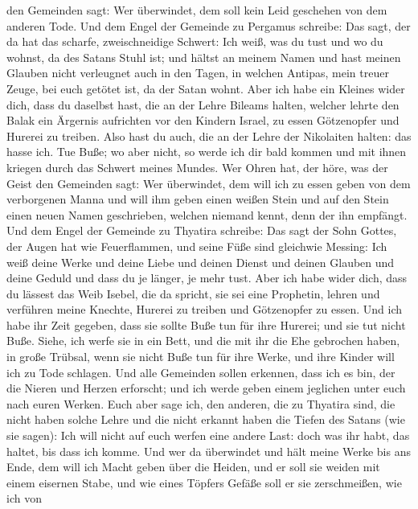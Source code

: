 den Gemeinden sagt: Wer überwindet, dem soll kein Leid geschehen von dem
anderen Tode.  Und dem Engel der Gemeinde zu Pergamus
schreibe: Das sagt, der da hat das scharfe, zweischneidige Schwert:
 Ich weiß, was du tust und wo du wohnst, da des Satans
Stuhl ist; und hältst an meinem Namen und hast meinen Glauben nicht
verleugnet auch in den Tagen, in welchen Antipas, mein treuer Zeuge, bei
euch getötet ist, da der Satan wohnt.  Aber ich habe ein
Kleines wider dich, dass du daselbst hast, die an der Lehre Bileams
halten, welcher lehrte den Balak ein Ärgernis aufrichten vor den Kindern
Israel, zu essen Götzenopfer und Hurerei zu treiben.  Also
hast du auch, die an der Lehre der Nikolaiten halten: das hasse ich.
 Tue Buße; wo aber nicht, so werde ich dir bald kommen und
mit ihnen kriegen durch das Schwert meines Mundes.  Wer
Ohren hat, der höre, was der Geist den Gemeinden sagt: Wer überwindet,
dem will ich zu essen geben von dem verborgenen Manna und will ihm geben
einen weißen Stein und auf den Stein einen neuen Namen geschrieben,
welchen niemand kennt, denn der ihn empfängt.  Und dem
Engel der Gemeinde zu Thyatira schreibe: Das sagt der Sohn Gottes, der
Augen hat wie Feuerflammen, und seine Füße sind gleichwie Messing:
 Ich weiß deine Werke und deine Liebe und deinen Dienst und
deinen Glauben und deine Geduld und dass du je länger, je mehr tust.
 Aber ich habe wider dich, dass du lässest das Weib Isebel,
die da spricht, sie sei eine Prophetin, lehren und verführen meine
Knechte, Hurerei zu treiben und Götzenopfer zu essen.  Und
ich habe ihr Zeit gegeben, dass sie sollte Buße tun für ihre Hurerei;
und sie tut nicht Buße.  Siehe, ich werfe sie in ein Bett,
und die mit ihr die Ehe gebrochen haben, in große Trübsal, wenn sie
nicht Buße tun für ihre Werke,  und ihre Kinder will ich zu
Tode schlagen. Und alle Gemeinden sollen erkennen, dass ich es bin, der
die Nieren und Herzen erforscht; und ich werde geben einem jeglichen
unter euch nach euren Werken.  Euch aber sage ich, den
anderen, die zu Thyatira sind, die nicht haben solche Lehre und die
nicht erkannt haben die Tiefen des Satans (wie sie sagen): Ich will
nicht auf euch werfen eine andere Last:  doch was ihr habt,
das haltet, bis dass ich komme.  Und wer da überwindet und
hält meine Werke bis ans Ende, dem will ich Macht geben über die Heiden,
 und er soll sie weiden mit einem eisernen Stabe, und wie
eines Töpfers Gefäße soll er sie zerschmeißen,  wie ich von
